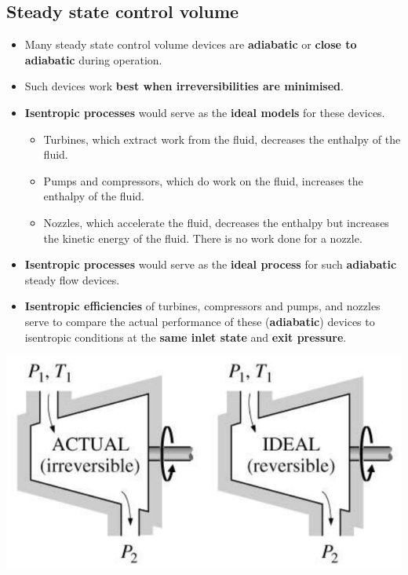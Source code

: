 \documentclass[11pt]{article}
\begin{document}
\subsection{Steady state control volume}
\label{sec:org428421c}
\begin{itemize}
\item Many steady state control volume devices are \textbf{adiabatic} or \textbf{close to adiabatic} during operation.
\item Such devices work \textbf{best when irreversibilities are minimised}.
\item \textbf{Isentropic processes} would serve as the \textbf{ideal models} for these devices.
\begin{itemize}
\item Turbines, which extract work from the fluid, decreases the enthalpy of the fluid.
\item Pumps and compressors, which do work on the fluid, increases the enthalpy of the fluid.
\item Nozzles, which accelerate the fluid, decreases the enthalpy but increases the kinetic energy of the fluid. There is no work done for a nozzle.
\end{itemize}
\item \textbf{Isentropic processes} would serve as the \textbf{ideal process} for such \textbf{adiabatic} steady flow devices.
\item \textbf{Isentropic efficiencies} of turbines, compressors and pumps, and nozzles serve to compare the actual performance of these (\textbf{adiabatic}) devices to isentropic conditions at the \textbf{same inlet state} and \textbf{exit pressure}.
\end{itemize}

\begin{center}
\includegraphics[width=.9\linewidth]{./images/isentropic-efficiency-comparison.png}
\end{center}
\end{document}
